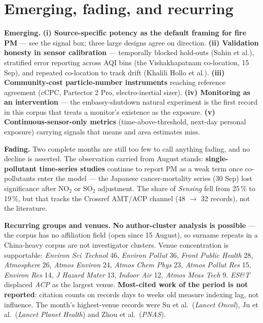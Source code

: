 \documentclass[10pt]{article}
\begin{document}
\clearpage

\section*{\sffamily\bfseries\color{Deep}Emerging, fading, and recurring}
\vspace{-1.5mm}{\color{Coral}\rule{\linewidth}{1.1pt}}\vspace{2.5mm}

\footnotesize
\textbf{Emerging.} \textbf{(i) Source-specific potency as the default framing for fire PM} ---
see the signal box; three large designs agree on direction. \textbf{(ii) Validation honesty in
sensor calibration} --- temporally blocked hold-outs (Sahin et al.), stratified error reporting
across AQI bins (the Vishakhapatnam co-location, 15 Sep), and repeated co-location to track drift
(Khalili Hollo et al.). \textbf{(iii) Community-cost particle-number instruments} reaching
reference agreement (cCPC, Partector 2 Pro, electro-inertial sizer). \textbf{(iv) Monitoring as an
intervention} --- the embassy-shutdown natural experiment is the first record in this corpus that
treats a monitor's existence as the exposure. \textbf{(v) Continuous-sensor-only metrics}
(time-above-threshold, next-day personal exposure) carrying signals that means and area estimates
miss.

\vspace{2mm}
\textbf{Fading.} Two complete months are still too few to call anything fading, and no decline
is asserted. The observation carried from August stands: \textbf{single-pollutant time-series
studies} continue to report PM as a weak term once co-pollutants enter the model --- the Japanese
cancer-mortality series (30 Sep) lost significance after NO$_2$ or SO$_2$ adjustment. The share of
\textit{Sensing} fell from 25\,\% to 19\,\%, but that tracks the Crossref AMT/ACP channel (48
$\rightarrow$ 32 records), not the literature.

\vspace{2mm}
\textbf{Recurring groups and venues.} \textbf{No author-cluster analysis is possible} --- the corpus
has no affiliation field (open since 15 August), so surname repeats in a China-heavy corpus are not
investigator clusters. Venue concentration is supportable: \textit{Environ Sci Technol} 46,
\textit{Environ Pollut} 36, \textit{Front Public Health} 28, \textit{Atmosphere} 26, \textit{Atmos
Environ} 24, \textit{Atmos Chem Phys} 23, \textit{Atmos Pollut Res} 15, \textit{Environ Res} 14,
\textit{J Hazard Mater} 13, \textit{Indoor Air} 12, \textit{Atmos Meas Tech} 9. \textit{ES\&T}
displaced \textit{ACP} as the largest venue. \textbf{Most-cited work of the period is not reported}:
citation counts on records days to weeks old measure indexing lag, not influence. The month's
highest-venue records were Su et al.\ (\textit{Lancet Oncol}), Ju et al.\ (\textit{Lancet Planet
Health}) and Zhou et al.\ (\textit{PNAS}).
\end{document}
